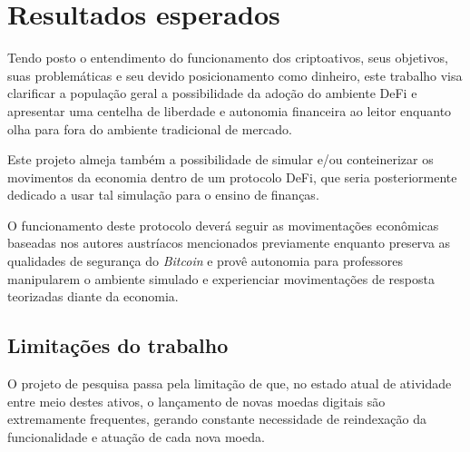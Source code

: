 \chapter{Resultados esperados}

Tendo posto o entendimento do funcionamento dos criptoativos, seus objetivos, suas problemáticas e seu devido posicionamento como dinheiro, este trabalho visa clarificar a população geral a possibilidade da adoção do ambiente DeFi e apresentar uma centelha de liberdade e autonomia financeira ao leitor enquanto olha para fora do ambiente tradicional de mercado.

Este projeto almeja também a possibilidade de simular e/ou conteinerizar os movimentos da economia dentro de um protocolo DeFi, que seria posteriormente dedicado a usar tal simulação para o ensino de finanças.

O funcionamento deste protocolo deverá seguir as movimentações econômicas baseadas nos autores austríacos mencionados previamente enquanto preserva as qualidades de segurança do \textit{Bitcoin} e provê autonomia para professores manipularem o ambiente simulado e experienciar movimentações de resposta teorizadas diante da economia.

\section{Limitações do trabalho}

O projeto de pesquisa passa pela limitação de que, no estado atual de atividade entre meio destes ativos, o lançamento de novas moedas digitais são extremamente frequentes, gerando constante necessidade de reindexação da funcionalidade e atuação de cada nova moeda.

